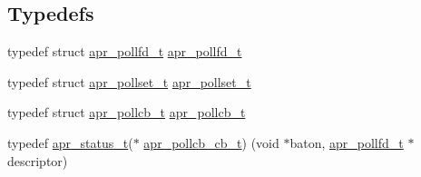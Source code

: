 \subsection*{Typedefs}
\begin{DoxyCompactItemize}
\item 
typedef struct \mbox{\hyperlink{structapr__pollfd__t}{apr\+\_\+pollfd\+\_\+t}} \mbox{\hyperlink{group__apr__poll_ga0c89b184cbe2337e44207f1ad245129b}{apr\+\_\+pollfd\+\_\+t}}
\item 
typedef struct \mbox{\hyperlink{structapr__pollset__t}{apr\+\_\+pollset\+\_\+t}} \mbox{\hyperlink{group__apr__poll_ga680da1f10ac5ef75efc503a9d15b8906}{apr\+\_\+pollset\+\_\+t}}
\item 
typedef struct \mbox{\hyperlink{structapr__pollcb__t}{apr\+\_\+pollcb\+\_\+t}} \mbox{\hyperlink{group__apr__poll_gae382e39bdf0c5a02fca7da3944bece08}{apr\+\_\+pollcb\+\_\+t}}
\item 
typedef \mbox{\hyperlink{group__apr__errno_gaf76ee4543247e9fb3f3546203e590a6c}{apr\+\_\+status\+\_\+t}}($\ast$ \mbox{\hyperlink{group__apr__poll_ga1dcd8c87e233dbf105e83d50ef601f55}{apr\+\_\+pollcb\+\_\+cb\+\_\+t}}) (void $\ast$baton, \mbox{\hyperlink{structapr__pollfd__t}{apr\+\_\+pollfd\+\_\+t}} $\ast$descriptor)
\end{DoxyCompactItemize}
